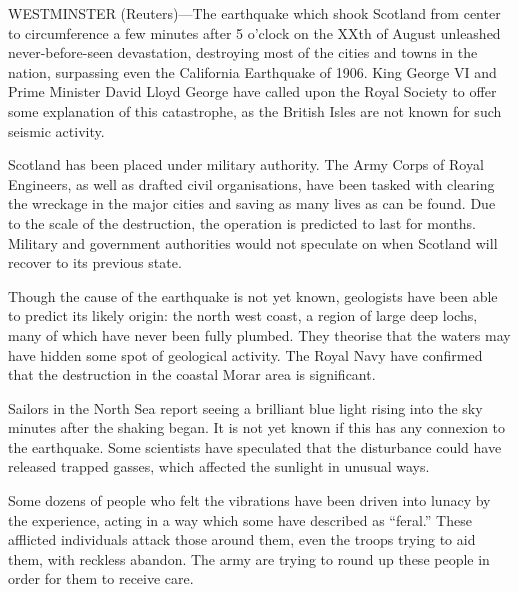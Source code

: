 \documentclass{newspaper1920}
\begin{document}
\fancyrule
\vspace{-\baselineskip}
\vspace{-\baselineskip}
\begin{multicols}{3}
WESTMINSTER (Reuters)---The earthquake which shook Scotland from
center to circumference a few minutes after 5 o'clock on the XXth of
August unleashed never-before-seen devastation, destroying most of the
cities and towns in the nation, surpassing even the California
Earthquake of 1906.  King George VI and Prime Minister David Lloyd
George have called upon the Royal Society to offer some explanation of
this catastrophe, as the British Isles are not known for such seismic
activity.

Scotland has been placed under military authority.  The Army Corps of
Royal Engineers, as well as drafted civil organisations, have been
tasked with clearing the wreckage in the major cities and saving as
many lives as can be found.  Due to the scale of the destruction, the
operation is predicted to last for months.  Military and government
authorities would not speculate on when Scotland will recover to its
previous state.

Though the cause of the earthquake is not yet known, geologists have
been able to predict its likely origin: the north west coast, a region
of large deep lochs, many of which have never been fully plumbed.
They theorise that the waters may have hidden some spot of geological
activity.  The Royal Navy have confirmed that the destruction in the
coastal Morar area is significant.


Sailors in the North Sea report seeing a brilliant blue light rising
into the sky minutes after the shaking began.  It is not yet known if
this has any connexion to the earthquake.  Some scientists have
speculated that the disturbance could have released trapped gasses,
which affected the sunlight in unusual ways.


Some dozens of people who felt the vibrations have been driven into
lunacy by the experience, acting in a way which some have described as
``feral.''  These afflicted individuals attack those around them, even
the troops trying to aid them, with reckless abandon.  The army are
trying to round up these people in order for them to receive care.

\vfill
{}

\end{multicols}
\end{document}
